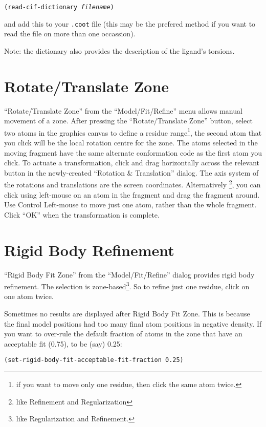 \documentclass{book}
\begin{document}
\texttt{(read-cif-dictionary \emph{filename})}

and add this to your \texttt{.coot} file (this may be the prefered
method if you want to read the file on more than one occassion).  

Note: the dictionary also provides the description of the ligand's
torsions.


\section{Rotate/Translate Zone}
\label{sec:rot_trans_zone}``Rotate/Translate 
Zone'' from the ``Model/Fit/Refine'' menu allows manual movement of a
zone.  After pressing the ``Rotate/Translate Zone'' button, select two
atoms in the graphics canvas to define a residue range\footnote{if you
  want to move only one residue, then click the same atom twice.}, the
second atom that you click will be the local rotation centre for the
zone.  The atoms selected in the moving fragment have the same
alternate conformation code as the first atom you click.  To actuate a
transformation, click and drag horizontally across the relevant button
in the newly-created ``Rotation \& Translation'' dialog. The axis
system of the rotations and translations are the screen coordinates.
Alternatively \footnote{like Refinement and Regularization}, you can
click using left-mouse on an atom in the fragment and drag the
fragment around. Use Control Left-mouse to move just one atom, rather
than the whole fragment.  Click ``OK'' when the transformation is
complete.

\section{Rigid Body Refinement}
\label{sec:RigidBodyRefinement} 
``Rigid Body Fit Zone'' from the
``Model/Fit/Refine'' dialog provides rigid body refinement.  The
selection is zone-based\footnote{like Regularization and Refinement.}.
So to refine just one residue, click on one atom twice.

Sometimes no results are displayed after Rigid Body Fit Zone.  This is
because the final model positions had too many final atom positions in
negative density.  If you want to over-rule the default fraction of
atoms in the zone that have an acceptable fit (0.75), to be (say)
0.25:

\texttt{(set-rigid-body-fit-acceptable-fit-fraction 0.25)}
\end{document}
